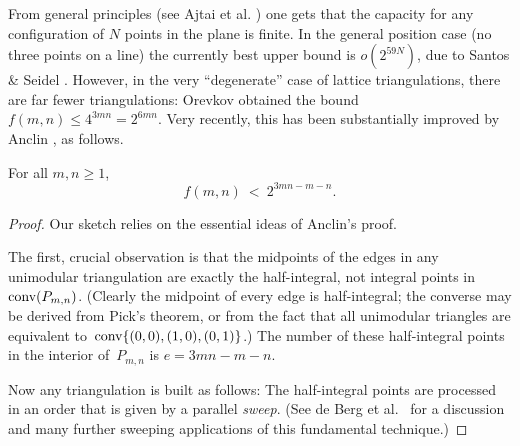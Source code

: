 From general principles (see Ajtai et al. \cite{ACNS}) one
gets that the capacity for any configuration of $N$ points in the plane
is finite. In the general position case (no three points on a line)
the currently best upper bound is $o(2^{59N})$,
due to Santos \& Seidel \cite{SantosSeidel}.
However, in the very ``degenerate'' case of lattice triangulations,
there are far fewer triangulations:
Orevkov \cite{Orevkov} obtained the bound $f(m,n)\le4^{3mn}=2^{6mn}$.
Very recently, this has been substantially improved by
Anclin \cite{Anclin}, as follows.

\begin{theorem}
\label{thm:anclin}
For all $m,n\ge1$,
\[
f(m,n)\ <\ 2^{3mn-m-n}.
\] 
\end{theorem}

\begin{proof}
Our sketch relies on the essential ideas of Anclin's proof.

The first, crucial observation is that the
midpoints of the edges in any unimodular triangulation 
are exactly the half-integral, not integral points
in~$\mbox{\rm conv}(P_{m,n})$. (Clearly the midpoint of every edge
is half-integral; the converse
may be derived from Pick's theorem, or from the fact that all 
unimodular triangles are
equivalent to~$\mbox{\rm conv}\{(0,0),(1,0),(0,1)\}$.)
The number of these half-integral points in the interior of~$P_{m,n}$ 
is $e=3mn-m-n$.

Now any triangulation is built as follows:
The half-integral points are processed in 
an order that is given by a parallel \emph{sweep}.
(See de Berg et al.~\cite[Sect.~2.1]{4Marks}
for a discussion and many further sweeping applications
of this fundamental technique.)


\end{proof}
